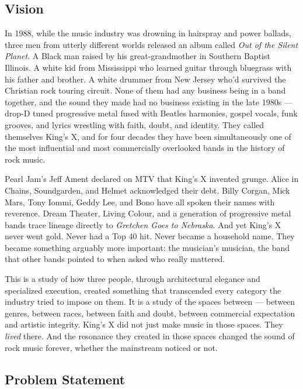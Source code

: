 \documentclass[11pt,letterpaper]{article}
\begin{document}
\subsection{Vision}

In 1988, while the music industry was drowning in hairspray and power ballads, three men from utterly different worlds released an album called \textit{Out of the Silent Planet}. A Black man raised by his great-grandmother in Southern Baptist Illinois. A white kid from Mississippi who learned guitar through bluegrass with his father and brother. A white drummer from New Jersey who'd survived the Christian rock touring circuit. None of them had any business being in a band together, and the sound they made had no business existing in the late 1980s --- drop-D tuned progressive metal fused with Beatles harmonies, gospel vocals, funk grooves, and lyrics wrestling with faith, doubt, and identity. They called themselves King's X, and for four decades they have been simultaneously one of the most influential and most commercially overlooked bands in the history of rock music.

Pearl Jam's Jeff Ament declared on MTV that King's X invented grunge. Alice in Chains, Soundgarden, and Helmet acknowledged their debt. Billy Corgan, Mick Mars, Tony Iommi, Geddy Lee, and Bono have all spoken their names with reverence. Dream Theater, Living Colour, and a generation of progressive metal bands trace lineage directly to \textit{Gretchen Goes to Nebraska}. And yet King's X never went gold. Never had a Top 40 hit. Never became a household name. They became something arguably more important: the musician's musician, the band that other bands pointed to when asked who really mattered.

This is a study of how three people, through architectural elegance and specialized execution, created something that transcended every category the industry tried to impose on them. It is a study of the spaces between --- between genres, between races, between faith and doubt, between commercial expectation and artistic integrity. King's X did not just make music in those spaces. They \textit{lived} there. And the resonance they created in those spaces changed the sound of rock music forever, whether the mainstream noticed or not.

\subsection{Problem Statement}
\end{document}
